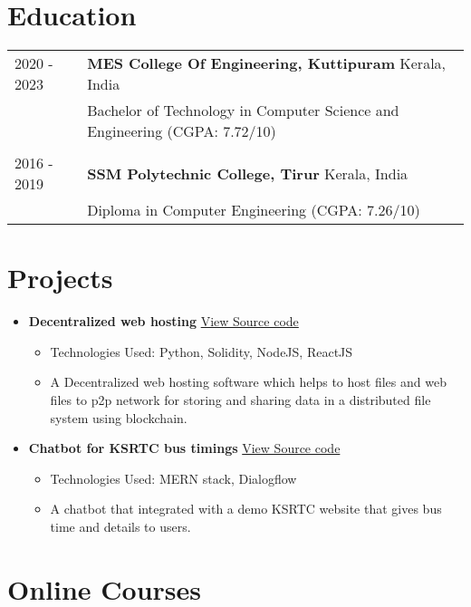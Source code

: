 \documentclass[a4paper,12pt]{article}
\begin{document}
\section{Education}
\begin{tabularx}{\linewidth}{@{}l X@{}}	
2020 - 2023 & \textbf{MES College Of Engineering, Kuttipuram} \hfill \normalsize Kerala, India \\
&Bachelor of Technology in Computer Science and Engineering \hfill (CGPA: 7.72/10) \\
\\
2016 - 2019 & \textbf{SSM Polytechnic College, Tirur} \hfill \normalsize Kerala, India \\
& Diploma in Computer Engineering \hfill (CGPA: 7.26/10) \\

\end{tabularx}

\section*{Projects}
\begin{itemize}
    \item \textbf{Decentralized web hosting}  \hfill \href{https://github.com/Aswintt/Dwebhosting}{View Source code}
    \begin{itemize}
        \item Technologies Used: Python, Solidity, NodeJS, ReactJS
        \item A Decentralized web hosting software which helps to host files and web files to p2p network for storing and sharing data in a distributed file system using blockchain.
    \end{itemize}
     \item \textbf{Chatbot for KSRTC bus timings}  \hfill \href{https://github.com/Aswintt/KSRTC-bus-timings-chatbot}{View Source code}
    \begin{itemize}
        \item Technologies Used: MERN stack, Dialogflow
        \item A chatbot that integrated with a demo KSRTC website that gives bus time and details to users.
    \end{itemize}   
    
\end{itemize}

\section{Online Courses}
\end{document}
